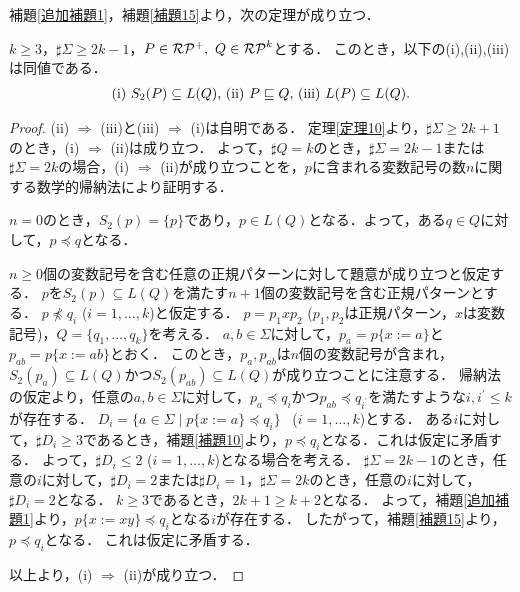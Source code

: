補題\ref{追加補題1}，補題\ref{補題15}より，次の定理が成り立つ．

\begin{thm}\label{定理17}
$k \ge 3$，$\sharp \Sigma \ge 2k-1$，$P \in \mathcal{RP^{+}},~Q \in \mathcal{RP}^{k}$とする．
このとき，以下の{\rm (i),(ii),(iii)}は同値である．
\[
\begin{tabular}{ll}
$(\mathrm{i})$ $S_{2}(P) \subseteq L(Q)$,
$(\mathrm{ii})$ $P \sqsubseteq Q$,
$(\mathrm{iii})$ $L(P) \subseteq L(Q)$.
\end{tabular}
\]
\end{thm}

\begin{proof}
(ii) $\Rightarrow$ (iii)と(iii) $\Rightarrow$ (i)は自明である．
定理\ref{定理10}より，$\sharp\Sigma \ge 2k+1$のとき，(i) $\Rightarrow$ (ii)は成り立つ．
よって，$\sharp Q=k$のとき，$\sharp\Sigma = 2k-1$または$\sharp\Sigma = 2k$の場合，(i) $\Rightarrow$ (ii)が成り立つことを，$p$に含まれる変数記号の数$n$に関する数学的帰納法により証明する．

$n=0$のとき，$S_{2}(p)= \{ p \}$であり，$p \in L(Q)$となる．よって，ある$q \in Q$に対して，$p \preceq q$となる．

$n \ge 0$個の変数記号を含む任意の正規パターンに対して題意が成り立つと仮定する．
$p$を$S_{2}(p) \subseteq L(Q)$を満たす$n+1$個の変数記号を含む正規パターンとする．
$p \not \preceq q_{i}$ ($i=1, \ldots, k$)と仮定する．
$p=p_{1}xp_{2}$ ($p_{1},p_{2}$は正規パターン，$x$は変数記号)，$Q=\{ q_{1}, \ldots , q_{k} \}$を考える．
$a, b \in \Sigma$に対して，$p_{a}=p \{ x := a \}$と$p_{ab}=p \{ x := ab \}$とおく．
このとき，$p_{a},p_{ab}$は$n$個の変数記号が含まれ，$S_{2}(p_{a}) \subseteq L(Q)$かつ$S_{2}(p_{ab}) \subseteq L(Q)$が成り立つことに注意する．
帰納法の仮定より，任意の$a,b \in \Sigma$に対して，$p_{a} \preceq q_{i}$かつ$p_{ab} \preceq q_{i^{\prime}}$を満たすような$i, i^{\prime} \le k$が存在する． 
$D_{i}=\{ a \in \Sigma \mid p \{ x:=a \} \preceq q_{i} \}$ \ ($i=1, \ldots, k$)とする．
ある$i$に対して，$\sharp D_{i} \ge 3$であるとき，補題\ref{補題10}より，$p \preceq q_{i}$となる．これは仮定に矛盾する．
よって，$\sharp D_{i} \le 2$ ($i=1, \ldots, k$)となる場合を考える．
$\sharp\Sigma = 2k-1$のとき，任意の$i$に対して，$\sharp D_{i}=2$または$\sharp D_{i}=1$，$\sharp\Sigma = 2k$のとき，任意の$i$に対して，$\sharp D_{i}=2$となる．
$k \ge 3$であるとき，$2k+1 \ge k+2$となる．
よって，補題\ref{追加補題1}より，$p \{ x:=xy \} \preceq q_{i}$となる$i$が存在する．
したがって，補題\ref{補題15}より，$p \preceq q_{i}$となる．
これは仮定に矛盾する．
  
以上より，(i) $\Rightarrow$ (ii)が成り立つ．
\end{proof}

